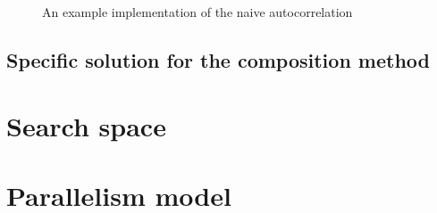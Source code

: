           \begin{figure}
            \caption{An example implementation of the naive autocorrelation}
            \label{naive_auto:fig:1}
          \end{figure}
      \subsection{Specific solution for the composition method}




  \section{Search space}
  \section{Parallelism model}
